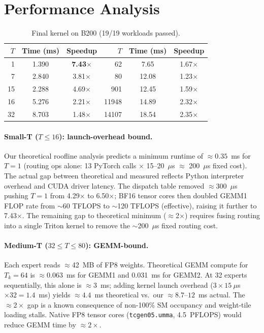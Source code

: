 \section{Performance Analysis}
\label{sec:perf}

\begin{table}[H]
\centering\small\setlength{\tabcolsep}{4pt}
\caption{Final kernel on B200 (19/19 workloads passed).}
\label{tab:final}
\begin{tabular}{rcc|rcc}
\toprule
$T$ & Time (ms) & Speedup & $T$ & Time (ms) & Speedup \\
\midrule
1   & 1.390 & \textbf{7.43$\times$} & 62   & 7.65  & 1.67$\times$ \\
7   & 2.840 & 3.81$\times$          & 80   & 12.08 & 1.23$\times$ \\
15  & 2.288 & 4.69$\times$          & 901  & 12.45 & 1.59$\times$ \\
16  & 5.276 & 2.21$\times$          & 11948& 14.89 & 2.32$\times$ \\
32  & 8.703 & 1.48$\times$          & 14107& 18.54 & 2.35$\times$ \\
\bottomrule
\end{tabular}
\end{table}

\paragraph{Small-T ($T\!\le\!16$): launch-overhead bound.}
Our theoretical roofline analysis predicts a minimum runtime of ${\approx}0.35$~ms for $T{=}1$ (routing ops alone: 13 PyTorch calls $\times$ 15--20~$\mu$s $\approx$ 200~$\mu$s fixed cost).
The actual gap between theoretical and measured reflects Python interpreter overhead and CUDA driver latency.
The dispatch table removed ${\approx}$300~$\mu$s pushing $T{=}1$ from 4.29$\times$ to 6.50$\times$; BF16 tensor cores then doubled GEMM1 FLOP rate from ${\sim}$60 TFLOPS to ${\sim}$120 TFLOPS (effective), raising it further to 7.43$\times$.
The remaining gap to theoretical minimum (${\approx}$2$\times$) requires fusing routing into a single Triton kernel to remove the ${\sim}$200~$\mu$s fixed routing cost.

\paragraph{Medium-T ($32\!\le\!T\!\le\!80$): GEMM-bound.}
Each expert reads ${\approx}$42~MB of FP8 weights.
Theoretical GEMM compute for $T_k{=}64$ is ${\approx}$0.063~ms for GEMM1 and 0.031~ms for GEMM2.
At 32 experts sequentially, this alone is ${\approx}3$~ms; adding kernel launch overhead ($3\times15~\mu$s $\times 32 = 1.4$~ms) yields ${\approx}4.4$~ms theoretical vs.\ our ${\approx}8.7$--$12$~ms actual.
The ${\approx}2\times$ gap is a known consequence of non-100\% SM occupancy and weight-tile loading stalls.
Native FP8 tensor cores (\texttt{tcgen05.umma}, 4.5~PFLOPS) would reduce GEMM time by ${\approx}2\times$.

